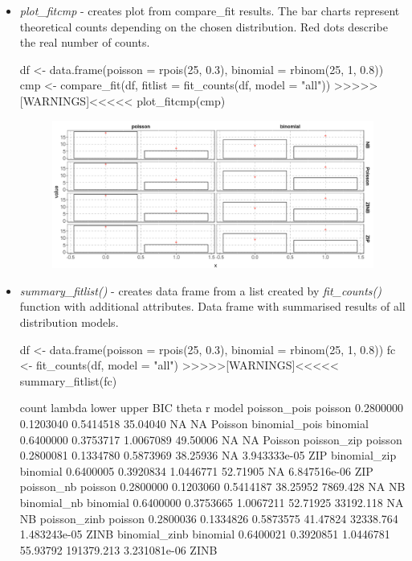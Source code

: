 \begin{itemize}
    \item \textit{plot\_fitcmp} - creates plot from compare\_fit results. The bar charts represent theoretical counts depending on the chosen distribution. Red dots describe the real number of counts.

{\bfseries
\begin{example}
df <- data.frame(poisson = rpois(25, 0.3), binomial = rbinom(25, 1, 0.8))
cmp <- compare_fit(df, fitlist = fit_counts(df, model = "all")) >>>>>[WARNINGS]<<<<<
plot_fitcmp(cmp)
\end{example}
}

\begin{figure}[htbp]
  \centering
  \includegraphics[width=0.99\columnwidth]{Rplot}
  \label{figure:Rplot.png}
\end{figure}

\item \textit{summary\_fitlist()} - creates data frame from a list created by \textit{fit\_counts()} function with additional attributes. Data frame with summarised results of all distribution models.

{\bfseries
\begin{example}
df <- data.frame(poisson = rpois(25, 0.3), binomial = rbinom(25, 1, 0.8))
fc <- fit_counts(df, model = "all") >>>>>[WARNINGS]<<<<<
summary_fitlist(fc) 
\end{example}
}
\scriptsize{
\begin{example}
                 count    lambda     lower     upper      BIC      theta            r   model
poisson_pois   poisson 0.2800000 0.1203040 0.5414518 35.04040         NA           NA Poisson
binomial_pois binomial 0.6400000 0.3753717 1.0067089 49.50006         NA           NA Poisson
poisson_zip    poisson 0.2800081 0.1334780 0.5873969 38.25936         NA 3.943333e-05     ZIP
binomial_zip  binomial 0.6400005 0.3920834 1.0446771 52.71905         NA 6.847516e-06     ZIP
poisson_nb     poisson 0.2800000 0.1203060 0.5414187 38.25952   7869.428           NA      NB
binomial_nb   binomial 0.6400000 0.3753665 1.0067211 52.71925  33192.118           NA      NB
poisson_zinb   poisson 0.2800036 0.1334826 0.5873575 41.47824  32338.764 1.483243e-05    ZINB
binomial_zinb binomial 0.6400021 0.3920851 1.0446781 55.93792 191379.213 3.231081e-06    ZINB
\end{example}
}

\end{itemize}

